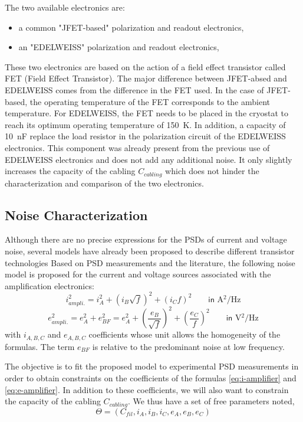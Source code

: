 The two available electronics are:
\begin{itemize}
\item a common "JFET-based" polarization and readout electronics,
\item an "EDELWEISS" polarization and readout electronics,
\end{itemize}
These two electronics are based on the action of a field effect transistor called FET (Field Effect Transistor). The major difference between JFET-absed and EDELWEISS comes from the difference in the FET used. In the case of JFET-based, the operating temperature of the FET corresponds to the ambient temperature. For EDELWEISS, the FET needs to be placed in the cryostat to reach its optimum operating temperature of \SI{150}{\kelvin}. In addition, a capacity of \SI{10}{\nano\farad} replace the load resistor in the polarization circuit of the EDELWEISS electronics. This component was already present from the previous use of EDELWEISS electronics and does not add any additional noise. It only slightly increases the capacity of the cabling  $C_{cabling}$ which does not hinder the characterization and comparison of the two electronics.


\subsection{Noise Characterization}

Although there are no precise expressions for the PSDs of current and voltage noise, several models have already been proposed to describe different transistor technologies
Based on PSD measurements and the literature, the following noise model is proposed for the current and voltage sources associated with the amplification electronics:
\begin{equation}
\label{eq:i-amplifier}
i_{ampli.}^2 = i_A^2 + (i_B \sqrt{f})^2 + (i_C f)^2 \qquad \textsf{in } \si{\ampere^2\per\Hz}
\end{equation}
\begin{equation}
\label{eq:e-amplifier}
e_{ampli.}^2 = e_A^2 + e_{BF}^2 = e_A^2 + \left( \frac{e_B}{\sqrt{f}} \right)^2 +\left( \frac{e_C}{f} \right)^2 \qquad \textsf{in } \si{\volt^2\per\Hz}
\end{equation}
with $i_{A,B,C}$ and $e_{A,B,C}$ coefficients whose unit allows the homogeneity of the formulas. The term $e_{BF}$ is relative to the predominant noise at low frequency.

The objective is to fit the proposed model to experimental PSD measurements in order to obtain constraints on the coefficients of the formulas \ref{eq:i-amplifier} and \ref{eq:e-amplifier}. In addition to these coefficients, we will also want to constrain the capacity of the cabling $C_{cabling}$. We thus have a set of free parameters noted,
\begin{equation}
\Theta=(C_{fil}, i_A, i_B, i_C, e_A, e_B, e_C)
\end{equation}


